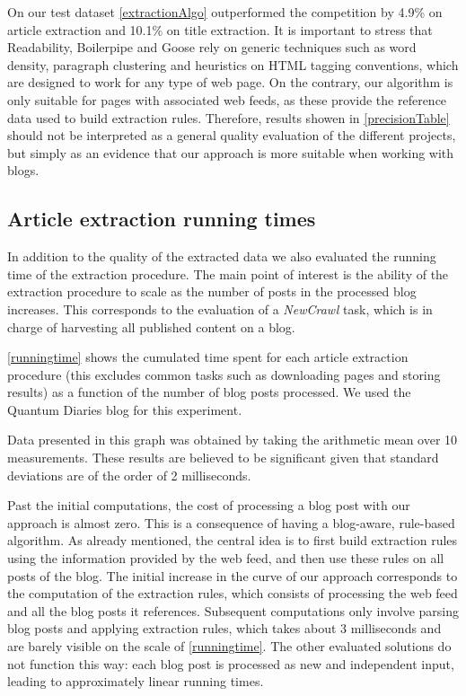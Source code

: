 \precisionTable

On our test dataset \autoref{extractionAlgo} outperformed the competition by 4.9\% on article extraction and 10.1\% on title extraction. It is important to stress that Readability, Boilerpipe and Goose rely on generic techniques such as word density, paragraph clustering and heuristics on HTML tagging conventions, which are designed to work for any type of web page. On the contrary, our algorithm is only suitable for pages with associated web feeds, as these provide the reference data used to build extraction rules. Therefore, results showen in \autoref{precisionTable} should not be interpreted as a general quality evaluation of the different projects, but simply as an evidence that our approach is more suitable when working with blogs.


\subsection{Article extraction running times}

In addition to the quality of the extracted data we also evaluated the running time of the extraction procedure. The main point of interest is the ability of the extraction procedure to scale as the number of posts in the processed blog increases. This corresponds to the evaluation of a \emph{NewCrawl} task, which is in charge of harvesting all published content on a blog.

\autoref{runningtime} shows the cumulated time spent for each article extraction procedure (this excludes common tasks such as downloading pages and storing results) as a function of the number of blog posts processed. We used the Quantum Diaries \cite{quantumdiaries} blog for this experiment.

Data presented in this graph was obtained by taking the arithmetic mean over 10 measurements. These results are believed to be significant given that standard deviations are of the order of 2 milliseconds.



Past the initial computations, the cost of processing a blog post with our approach is almost zero. This is a consequence of having a blog-aware, rule-based algorithm. As already mentioned, the central idea is to first build extraction rules using the information provided by the web feed, and then use these rules on all posts of the blog. The initial increase in the curve of our approach corresponds to the computation of the extraction rules, which consists of processing the web feed and all the blog posts it references. Subsequent computations only involve parsing blog posts and applying extraction rules, which takes about 3 milliseconds and are barely visible on the scale of \autoref{runningtime}. The other evaluated solutions do not function this way: each blog post is processed as new and independent input, leading to approximately linear running times.

